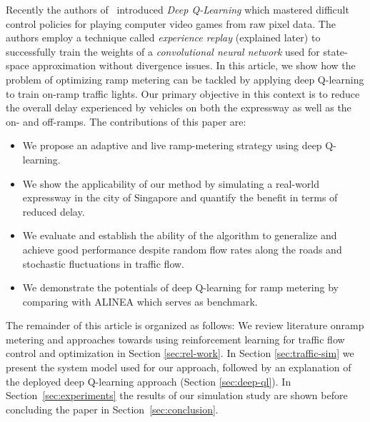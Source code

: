 \documentclass[conference]{IEEEtran}
\begin{document}
Recently the authors of~\cite{mnih2015human} introduced \textit{Deep Q-Learning} which mastered difficult control policies for playing computer video games from raw pixel data. The authors employ a technique called \textit{experience replay} (explained later) to successfully train the weights of a \textit{convolutional neural network} used for state-space approximation without divergence issues. In this article, we show how the problem of optimizing ramp metering can be tackled by applying deep Q-learning to train on-ramp traffic lights.
Our primary objective in this context is to reduce the overall delay experienced by vehicles on both the expressway as well as the on- and off-ramps.
The contributions of this paper are:
\begin{itemize}
	\item We propose an adaptive and live ramp-metering strategy using deep Q-learning.
	\item We show the applicability of our method by simulating a real-world expressway in the city of Singapore and quantify the benefit in terms of reduced delay.
	\item We evaluate and establish the ability of the algorithm to generalize and achieve good performance despite random flow rates along the roads and stochastic fluctuations in traffic flow. 
	\item We demonstrate the potentials of deep Q-learning for ramp metering by comparing with ALINEA which serves as benchmark.
\end{itemize}

The remainder of this article is organized as follows:
We review literature onramp metering and approaches towards using reinforcement learning for traffic flow control and optimization in Section \ref{sec:rel-work}.
In Section \ref{sec:traffic-sim} we present the system model used for our approach, followed by an explanation of the deployed deep Q-learning approach (Section \ref{sec:deep-ql}).
In Section~\ref{sec:experiments} the results of our simulation study are shown before concluding the paper in Section~\ref{sec:conclusion}.
\end{document}

